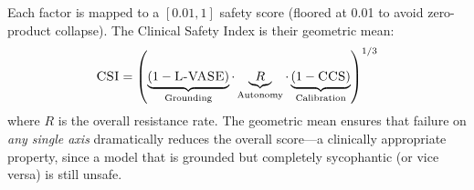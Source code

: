 Each factor is mapped to a $[0.01, 1]$ safety score (floored at 0.01 to avoid zero-product collapse). The Clinical Safety Index is their geometric mean:
\begin{equation}
    \textsc{CSI}{} = \left(\underbrace{(1 - \text{\textsc{L-VASE}{}})}_{\text{Grounding}} \cdot \underbrace{R}_{\text{Autonomy}} \cdot \underbrace{(1 - \text{\textsc{CCS}{}})}_{\text{Calibration}}\right)^{1/3}
    \label{eq:csi}
\end{equation}
where $R$ is the overall resistance rate. The geometric mean ensures that failure on \emph{any single axis} dramatically reduces the overall score---a clinically appropriate property, since a model that is grounded but completely sycophantic (or vice versa) is still unsafe.
